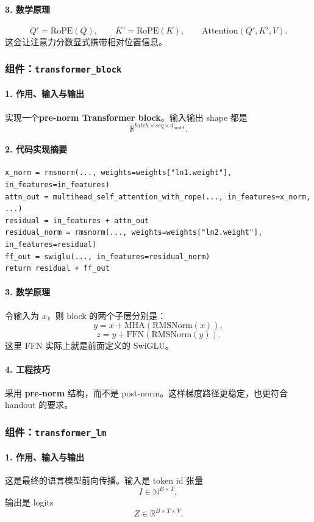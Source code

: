 \documentclass[UTF8,a4paper,11pt]{ctexart}
\begin{document}
\paragraph{3. 数学原理}
\[
Q' = \mathrm{RoPE}(Q), \qquad K' = \mathrm{RoPE}(K), \qquad
\mathrm{Attention}(Q',K',V).
\]
这会让注意力分数显式携带相对位置信息。

\subsubsection{组件：\texttt{transformer\_block}}
\paragraph{1. 作用、输入与输出}
实现一个\textbf{pre-norm Transformer block}。输入输出 shape 都是
\[
\mathbb{R}^{batch \times seq \times d_{\text{model}}}.
\]

\paragraph{2. 代码实现摘要}
\begin{lstlisting}
x_norm = rmsnorm(..., weights=weights["ln1.weight"], in_features=in_features)
attn_out = multihead_self_attention_with_rope(..., in_features=x_norm, ...)
residual = in_features + attn_out
residual_norm = rmsnorm(..., weights=weights["ln2.weight"], in_features=residual)
ff_out = swiglu(..., in_features=residual_norm)
return residual + ff_out
\end{lstlisting}

\paragraph{3. 数学原理}
令输入为 \(x\)，则 block 的两个子层分别是：
\[
y = x + \mathrm{MHA}(\mathrm{RMSNorm}(x)),
\]
\[
z = y + \mathrm{FFN}(\mathrm{RMSNorm}(y)).
\]
这里 FFN 实际上就是前面定义的 SwiGLU。

\paragraph{4. 工程技巧}
采用 \textbf{pre-norm} 结构，而不是 post-norm。这样梯度路径更稳定，也更符合 handout 的要求。

\subsubsection{组件：\texttt{transformer\_lm}}
\paragraph{1. 作用、输入与输出}
这是最终的语言模型前向传播。输入是 token id 张量
\[
I \in \mathbb{N}^{B \times T},
\]
输出是 logits
\[
Z \in \mathbb{R}^{B \times T \times V}.
\]
\end{document}
